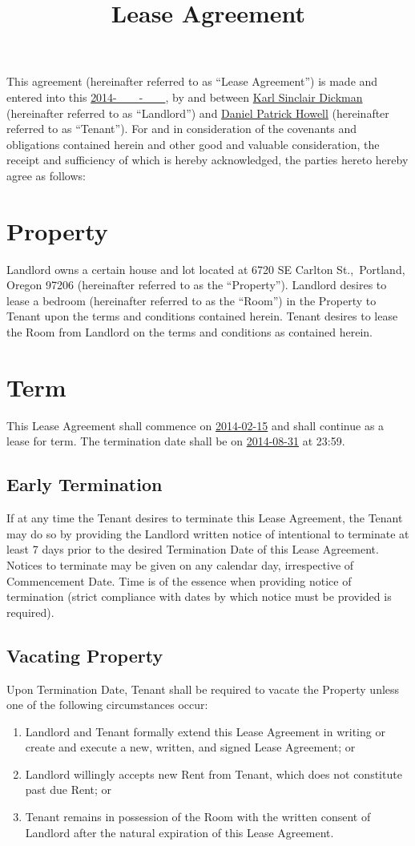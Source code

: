 \documentclass{amsart}
\title{Lease Agreement}
\begin{document}
\maketitle
This agreement (hereinafter referred to as ``Lease Agreement'') is made and
entered into this \underline{2014-\ \ \ \ -\ \ \ \ }, by and between \underline{Karl
Sinclair Dickman} (hereinafter referred to as ``Landlord'') and
\underline{Daniel Patrick Howell} (hereinafter referred to as ``Tenant'').  For
and in consideration of the covenants and obligations contained herein and other
good and valuable consideration, the receipt and sufficiency of which is hereby
acknowledged, the parties hereto hereby agree as follows:
\section{Property}
Landlord owns a certain house and lot located at 6720 SE Carlton St.,\ Portland,
Oregon 97206 (hereinafter referred to as the ``Property''). Landlord desires to
lease a bedroom (hereinafter referred to as the ``Room'') in the Property to
Tenant upon the terms and conditions contained herein. Tenant desires to lease
the Room from Landlord on the terms and conditions as contained herein.
\section{Term}
\label{sec:Term}
This Lease Agreement shall commence on \underline{2014-02-15} and shall continue
as a lease for term. The termination date shall be on \underline{2014-08-31} at
23:59.
\subsection{Early Termination}
\label{sec:early-termination}
If at any time the Tenant desires to terminate this Lease Agreement, the Tenant
may do so by providing the Landlord written notice of intentional to terminate
at least 7 days prior to the desired Termination Date of this Lease
Agreement. Notices to terminate may be given on any calendar day, irrespective
of Commencement Date. Time is of the essence when providing notice of
termination (strict compliance with dates by which notice must be provided is
required).
\subsection{Vacating Property}
Upon Termination Date, Tenant shall be required to vacate the Property unless
one of the following circumstances occur:
\begin{enumerate}
    \item Landlord and Tenant formally extend this Lease Agreement in writing or
        create and execute a new, written, and signed  Lease Agreement; or
    \item Landlord willingly accepts new Rent from Tenant, which does not
        constitute past due Rent; or
    \item Tenant remains in possession of the Room with the written consent of
        Landlord after the natural expiration of this Lease Agreement.
\end{enumerate}
\end{document}
